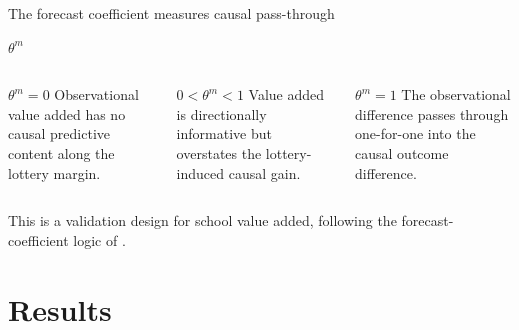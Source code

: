 \documentclass[11pt,aspectratio=169]{beamer}
\begin{document}
\begin{frame}{The forecast coefficient measures causal pass-through}
\begin{center}
\Large
$\theta^m$
\end{center}

\vspace{0.4em}
\begin{columns}[T,onlytextwidth]
  \begin{block}{$\theta^m=0$}
  Observational value added has no causal predictive content along the lottery margin.
  \end{block}

  \begin{block}{$0<\theta^m<1$}
  Value added is directionally informative but overstates the lottery-induced causal gain.
  \end{block}

  \begin{block}{$\theta^m=1$}
  The observational difference passes through one-for-one into the causal outcome difference.
  \end{block}
\end{columns}

\vspace{0.8em}
\begin{center}
This is a validation design for school value added, following the forecast-coefficient logic of \textcite{angrist_leveraging_2017}.
\end{center}
\end{frame}

\section{Results}
\end{document}
